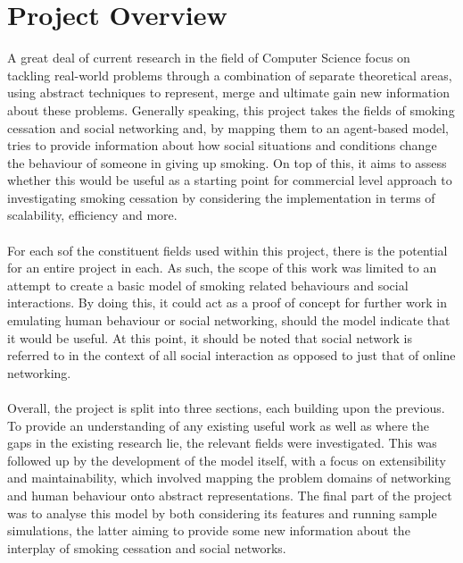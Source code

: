 \documentclass[]{report}
\begin{document}
\section{Project Overview}
A great deal of current research in the field of Computer Science focus on tackling real-world problems through a combination of separate theoretical areas, using abstract techniques to represent, merge and ultimate gain new information about these problems. Generally speaking, this project takes the fields of smoking cessation and social networking and, by mapping them to an agent-based model, tries to provide information about how social situations and conditions change the behaviour of someone in giving up smoking. On top of this, it aims to assess whether this would be useful as a starting point for commercial level approach to investigating smoking cessation by considering the implementation in terms of scalability, efficiency and more.\\ \\
For each sof the constituent fields used within this project, there is the potential for an entire project in each. As such, the scope of this work was limited to an attempt to create a basic model of smoking related behaviours and social interactions. By doing this, it could act as a proof of concept for further work in emulating human behaviour or social networking, should the model indicate that it would be useful. At this point, it should be noted that social network is referred to in the context of all social interaction as opposed to just that of online networking. \\ \\
Overall, the project is split into three sections, each building upon the previous. To provide an understanding of any existing useful work as well as where the gaps in the existing research lie, the relevant fields were investigated. This was followed up by the development of the model itself, with a focus on extensibility and maintainability, which involved mapping the problem domains of networking and human behaviour onto abstract representations. The final part of the project was to analyse this model by both considering its features and running sample simulations, the latter aiming to provide some new information about the interplay of smoking cessation and social networks. 
\end{document}
